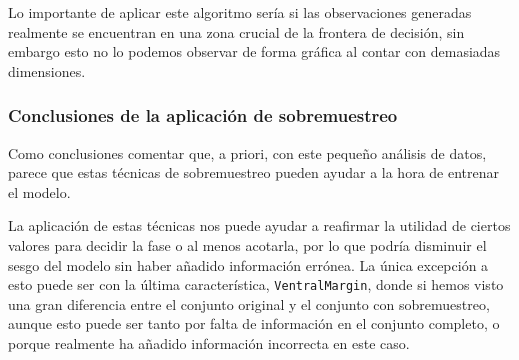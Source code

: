 Lo importante de aplicar este algoritmo sería si las observaciones generadas realmente se encuentran en una zona crucial de la frontera de decisión, sin embargo esto no lo podemos observar de forma gráfica al contar con demasiadas dimensiones.

\subsubsection{Conclusiones de la aplicación de sobremuestreo}


Como conclusiones comentar que, a priori, con este pequeño análisis de datos, parece que estas técnicas de sobremuestreo pueden ayudar a la hora de entrenar el modelo.

La aplicación de estas técnicas nos puede ayudar a reafirmar la utilidad de ciertos valores para decidir la fase o al menos acotarla, por lo que podría disminuir el sesgo del modelo sin haber añadido información errónea. La única excepción a esto puede ser con la última característica, \texttt{VentralMargin}, donde si hemos visto una gran diferencia entre el conjunto original y el conjunto con sobremuestreo, aunque esto puede ser tanto por falta de información en el conjunto completo, o porque realmente ha añadido información incorrecta en este caso.



\newpage
